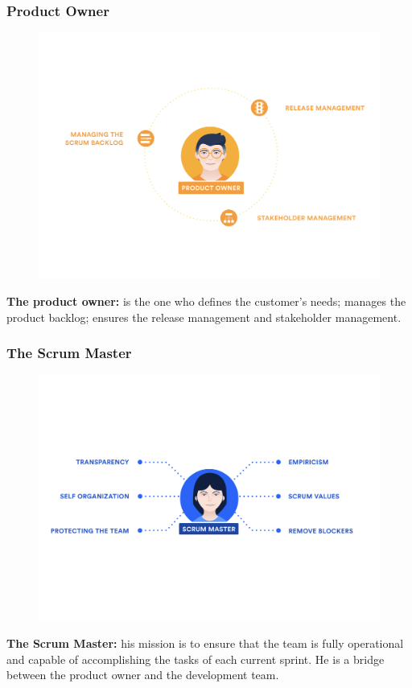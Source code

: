 \documentclass[
	11pt, %
]{beamer}
\begin{document}
\begin{frame}
	\frametitle{Product Owner}
	\begin{figure}
		\centering
		\includegraphics[width=0.7\linewidth]{Scrum-Product Owner-revised.png}
	\end{figure}
	\tiny
	\textbf{The product owner:} is the one who defines the customer's needs; manages the product backlog; ensures the release management and stakeholder management.
\end{frame}


\begin{frame}
	\frametitle{The Scrum Master}
	\begin{figure}
		\centering
		\includegraphics[width=0.7\linewidth]{Scrum-Master-revised.png}
	\end{figure}
	\tiny
	\textbf{The Scrum Master:} his mission is to ensure that the team is fully operational and capable
	of accomplishing the tasks of each current sprint. He is a bridge between the product owner and the development team.
\end{frame}



\end{document}
